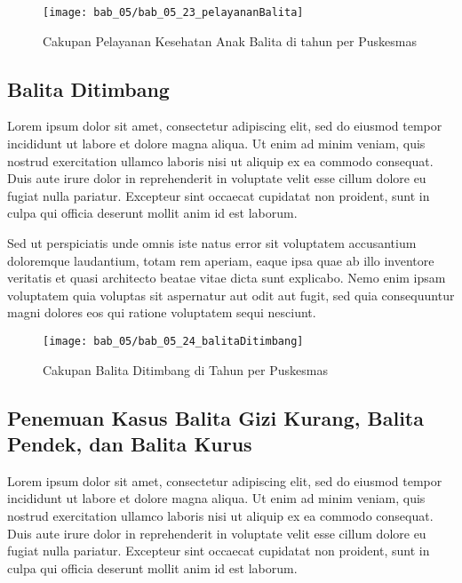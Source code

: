 \begin{figure}[H]
    \centering
    \texttt{[image: bab\_05/bab\_05\_23\_pelayananBalita]}
    \caption{Cakupan Pelayanan Kesehatan Anak Balita di \namaKabupaten tahun \tP per Puskesmas}
    \label{fig:Cakupan-Pelayanan-Kesehatan-Anak-Balita}
\end{figure}

\subsection{Balita Ditimbang}
\label{subsec:Balita-Ditimbang}
Lorem ipsum dolor sit amet, consectetur adipiscing elit, sed do eiusmod tempor incididunt ut labore et dolore magna aliqua. Ut enim ad minim veniam, quis nostrud exercitation ullamco laboris nisi ut aliquip ex ea commodo consequat. Duis aute irure dolor in reprehenderit in voluptate velit esse cillum dolore eu fugiat nulla pariatur. Excepteur sint occaecat cupidatat non proident, sunt in culpa qui officia deserunt mollit anim id est laborum.

Sed ut perspiciatis unde omnis iste natus error sit voluptatem accusantium doloremque laudantium, totam rem aperiam, eaque ipsa quae ab illo inventore veritatis et quasi architecto beatae vitae dicta sunt explicabo. Nemo enim ipsam voluptatem quia voluptas sit aspernatur aut odit aut fugit, sed quia consequuntur magni dolores eos qui ratione voluptatem sequi nesciunt.

\begin{figure}[H]
  \centering
  \texttt{[image: bab\_05/bab\_05\_24\_balitaDitimbang]}
  \caption{Cakupan Balita Ditimbang di \namaKabupaten Tahun \tP per Puskesmas}
  \label{fig:Cakupan-Balita-Ditimbang}
\end{figure}

\subsection{Penemuan Kasus Balita Gizi Kurang, Balita Pendek, dan Balita Kurus}
\label{subsec:Penemuan-Kasus-Gizi-Kurang}
Lorem ipsum dolor sit amet, consectetur adipiscing elit, sed do eiusmod tempor incididunt ut labore et dolore magna aliqua. Ut enim ad minim veniam, quis nostrud exercitation ullamco laboris nisi ut aliquip ex ea commodo consequat. Duis aute irure dolor in reprehenderit in voluptate velit esse cillum dolore eu fugiat nulla pariatur. Excepteur sint occaecat cupidatat non proident, sunt in culpa qui officia deserunt mollit anim id est laborum.

